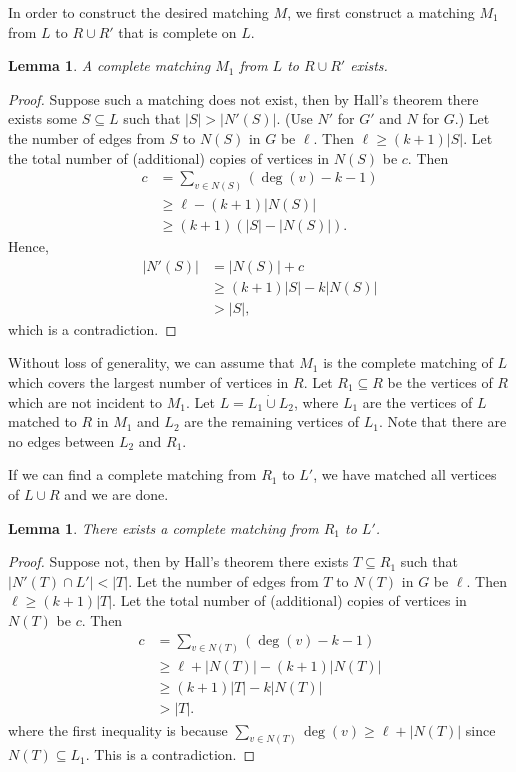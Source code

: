 \documentclass[11pt,letterpaper]{article}
\newtheorem{lemma}[theorem]{Lemma}
\theoremstyle{definition}
\begin{document}
In order to construct the desired matching $M$, we first construct a matching $M_1$ from $L$ to $R\cup R'$ that is complete on $L$. 
\begin{lemma}
    A complete matching $M_1$ from $L$ to $R\cup R'$ exists.
\end{lemma}
\begin{proof}
    Suppose such a matching does not exist, then by Hall's theorem there exists some $S\subseteq L$ such that $|S|>|N'(S)|$. (Use $N'$ for $G'$ and $N$ for $G$.)
    Let the number of edges from $S$ to $N(S)$ in $G$ be $\ell$. 
    Then $\ell\geq (k+1)|S|$.
    Let the total number of (additional) copies of vertices in $N(S)$ be $c$.
    Then
    \begin{align*}
        c  &= \sum_{v\in N(S)} (\deg(v) - k - 1) \\
        &\geq \ell - (k+1)|N(S)| \\
        &\geq (k+1)(|S|-|N(S)|).
    \end{align*}
    Hence, 
    \begin{align*}
        |N'(S)| &= |N(S)| + c \\
        &\geq (k+1)|S| - k|N(S)| \\
        &> |S|,
    \end{align*}
    which is a contradiction.
\end{proof}
Without loss of generality, we can assume that $M_1$ is the complete matching of $L$ which covers the largest number of vertices in $R$.
Let $R_1\subseteq R$ be the vertices of $R$ which are not incident to $M_1$.
Let $L = L_1\dot{\cup} L_2$, where $L_1$ are the vertices of $L$ matched to $R$ in $M_1$ and $L_2$ are the remaining vertices of $L_1$.
Note that there are no edges between $L_2$ and $R_1$.

If we can find a complete matching from $R_1$ to $L'$, we have matched all vertices of $L\cup R$ and we are done.
\begin{lemma}
    There exists a complete matching from $R_1$ to $L'$.
\end{lemma}
\begin{proof}
    Suppose not, then by Hall's theorem there exists $T\subseteq R_1$ such that $|N'(T)\cap L'|<|T|$.
    Let the number of edges from $T$ to $N(T)$ in $G$ be $\ell$. Then $\ell \geq (k+1)|T|$.
    Let the total number of (additional) copies of vertices in $N(T)$ be $c$.
    Then
    \begin{align*}
        c &= \sum_{v\in N(T)} (\deg(v) - k - 1) \\
        &\geq \ell + |N(T)| - (k+1)|N(T)| \\
        &\geq (k+1)|T| - k|N(T)| \\
        &> |T|.
    \end{align*}
    where the first inequality is because $\sum_{v\in N(T)}\deg(v) \geq \ell + |N(T)|$ since $N(T)\subseteq L_1$.
    This is a contradiction.
\end{proof}



\end{document}
